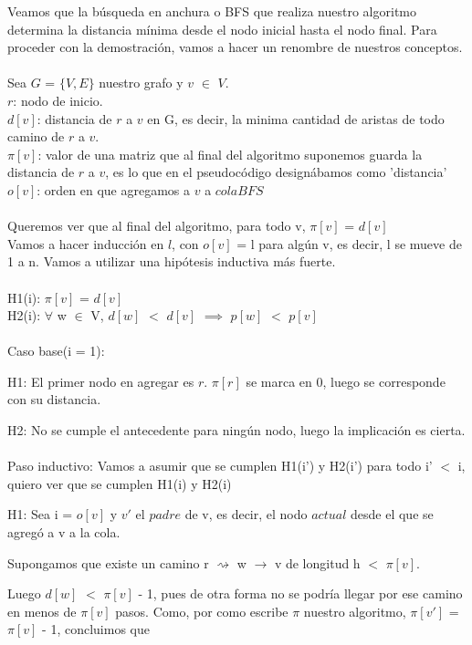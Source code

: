 \documentclass[11pt, a4paper, twoside]{article}
\begin{document}
{}
Veamos que la búsqueda en anchura o BFS que realiza nuestro algoritmo determina la distancia mínima desde el nodo inicial hasta el nodo final.
Para proceder con la demostración, vamos a hacer un renombre de nuestros conceptos.
\\\\ Sea $G$ = $\{V, E\}$ nuestro grafo y $v$ $\in$ $V$.
\\ $r$: nodo de inicio.
\\ $d[v]$: distancia de $r$ a $v$ en G, es decir, la minima cantidad de aristas de todo camino de $r$ a $v$.
\\ $\pi[v]$: valor de una matriz que al final del algoritmo suponemos guarda la distancia de $r$ a $v$, es lo que en el pseudocódigo designábamos como 'distancia'
\\$o[v]$: orden en que agregamos a $v$ a $colaBFS$
\\\\Queremos ver que al final del algoritmo, para todo v, $\pi[v]$ = $d[v]$
\\Vamos a hacer inducción en $l$, con $o[v]$ = l para algún v, es decir, l se mueve de 1 a n. Vamos a utilizar una hipótesis inductiva más fuerte.
\\\\H1(i): $\pi[v]$ = $d[v]$
\\H2(i): $\forall$ w $\in$ V, $d[w]$ $<$ $d[v]$ $\implies$ $p[w]$ $<$ $p[v]$
\\\\Caso base(i = 1): 

H1: El primer nodo en agregar es $r$. $\pi[r]$ se marca en 0, luego se corresponde con su distancia.

H2: No se cumple el antecedente para ningún nodo, luego la implicación es cierta.
\\\\Paso inductivo: Vamos a asumir que se cumplen H1(i') y H2(i') para todo i' $<$ i, quiero ver que se cumplen H1(i) y H2(i)

H1: Sea i = $o[v]$ y $v'$ el $padre$ de v, es decir, el nodo $actual$ desde el que se agregó a v a la cola.

Supongamos que existe un camino r $\rightsquigarrow$ w $\rightarrow$ v
de longitud h $<$ $\pi[v]$.

Luego $d[w]$ $<$ $\pi[v]$ - 1, pues de otra forma no se podría llegar por ese camino en menos de $\pi[v]$ pasos.
Como, por como escribe $\pi$ nuestro algoritmo, $\pi[v']$ = $\pi[v]$ - 1, concluimos que
\end{document}
